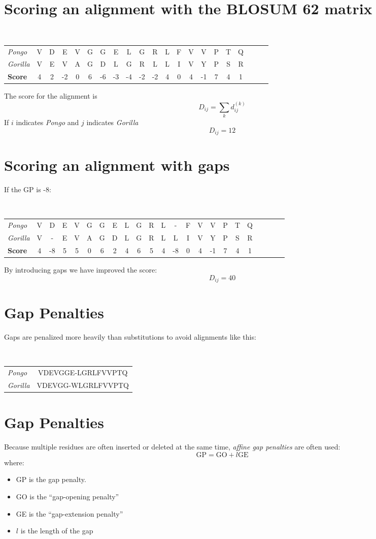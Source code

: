 \documentclass[landscape]{foils}
\begin{document}
\myNewSlide
\section*{Scoring an alignment with the BLOSUM 62 matrix}
\setlength{\hoffset}{-0.75in}
{\tt
\small
\begin{tabular}{lcccccccccccccccccccc}
{\em Pongo} &V&D&E&V&G&G&E&L&G&R&L&F&V&V&P&T&Q\\ 
{\em Gorilla} &V&E&V&A&G&D&L&G&R&L&L&I&V&Y&P&S&R\\
\hline
{\bf Score} &4&2&-2&0&6&-6&-3&-4&-2&-2&4&0&4&-1&7&4&1\\
\end{tabular}
}
\par
The score for the alignment is 
\[D_{ij} = \sum_{k} d_{ij}^{(k)} \]
If $i$ indicates {\em Pongo} and $j$ indicates {\em Gorilla}
\[D_{ij} = 12\]

\myNewSlide
\section*{Scoring an alignment with gaps}
\setlength{\hoffset}{-0.0in}
If the GP is -8:\par
{\tt
\small
\begin{tabular}{lcccccccccccccccccccccc}
{\em Pongo} &V&D&E&V&G&G&E&L&G&R&L&- &F&V&V&P&T&Q\\ 
{\em Gorilla} &V&- &E&V&A&G&D&L&G&R&L&L&I&V&Y&P&S&R\\
\hline
{\bf Score} &4&-8&5&5&0&6&2&4&6&5&4&-8&0&4&-1&7&4&1\\
\end{tabular}
}
\par
By introducing gaps we have improved the score:
\[D_{ij} = 40\]

\myNewSlide
\section*{Gap Penalties}
Gaps are penalized more heavily than substitutions to avoid alignments like this:\\
{\tt
\begin{center}
\begin{tabular}{lc}
{\em Pongo} &	VDEVGGE-LGRLFVVPTQ\\ 
{\em Gorilla} &  VDEVGG-WLGRLFVVPTQ\\
\end{tabular}
\end{center}
}
\myNewSlide
\setlength{\hoffset}{0in}
\section*{Gap Penalties}
Because multiple residues are often inserted or deleted at the same time, {\em affine gap penalties} are often used:
\[\mbox{GP} = \mbox{GO}+ l\mbox{GE} \]
 where: 
\begin{itemize}
	\item GP is the gap penalty.
	\item GO is the ``gap-opening penalty''
	\item GE is the ``gap-extension penalty''
	\item $l$ is the length of the gap
\end{itemize}
\end{document}
